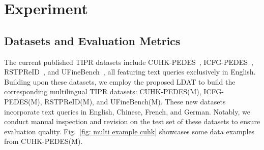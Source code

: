 \documentclass[10pt,journal,compsoc]{IEEEtran}
\begin{document}


\section{Experiment}

\subsection{Datasets and Evaluation Metrics}

The current published TIPR datasets include CUHK-PEDES~\cite{li2017person}, ICFG-PEDES~\cite{ding2021semantically}, RSTPReID~\cite{zhu2021dssl}, and UFineBench~\cite{zuo2024ufinebench}, all featuring text queries exclusively in English.
Building upon these datasets, we employ the proposed LDAT to build the corresponding multilingual TIPR datasets: CUHK-PEDES(M), ICFG-PEDES(M), RSTPReID(M), and UFineBench(M). These new datasets incorporate text queries in English, Chinese, French, and German.
Notably, we conduct manual inspection and revision on the test set of these datasets to ensure evaluation quality. 
Fig.~\ref{fig: multi example cuhk} showcases some data examples from CUHK-PEDES(M).
\end{document}
